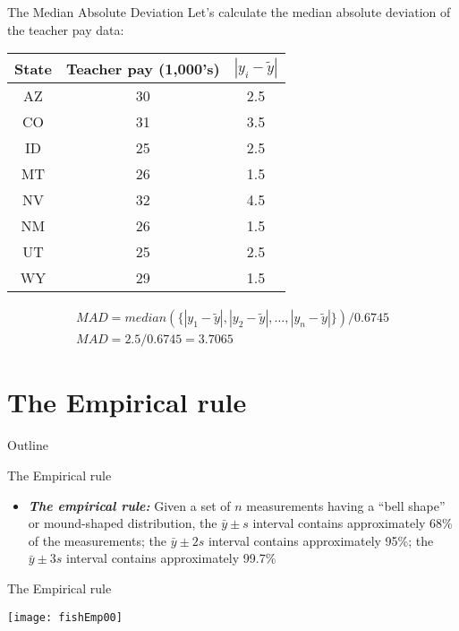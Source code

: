 \documentclass[xcolor=dvipsnames]{beamer}
\begin{document}
\begin{frame}{The Median Absolute Deviation}
	Let's calculate the median absolute deviation of the teacher pay data:
	\begin{center}
		\begin{tabular}{|c|c|c|}
			\hline 
			\textbf{State} & \textbf{Teacher pay (1,000's)} &  $|y_i-\tilde{y}|$ \\ 
			\hline \hline
			AZ & 30 & 2.5\\ \hline 
			CO &  31 & 3.5\\ \hline 
			ID & 25  & 2.5\\  \hline 
			MT &  26 & 1.5 \\ \hline 
			NV & 32 & 4.5\\ \hline 
			NM &  26 & 1.5\\ \hline 
			UT &  25 & 2.5\\ \hline 
			WY &  29 & 1.5\\ \hline 
		\end{tabular} 
	\end{center}
\begin{gather*}
	MAD = median(\{|y_1-\tilde{y}|,|y_2 - \tilde{y}|,\hdots,|y_n - \tilde{y}|\}) / 0.6745 \\
	MAD = 2.5 / 0.6745 = 3.7065
\end{gather*}
\end{frame}

\section{The Empirical rule}
\begin{frame}{Outline}
	\tableofcontents[currentsection,subsectionstyle=show/shaded/hide]
\end{frame}

\begin{frame}{The Empirical rule}
	\begin{itemize}
		\item \textbf{\emph{The empirical rule:}} Given a set of $n$ measurements having a ``bell shape'' or mound-shaped distribution, the $\bar{y} \pm s$ interval contains approximately 68\% of the measurements; the $\bar{y} \pm 2s$ interval contains approximately 95\%; the $\bar{y} \pm 3s$ interval contains approximately 99.7\%
	\end{itemize}
\end{frame}

\begin{frame}{The Empirical rule}
\begin{center}
	\texttt{[image: fishEmp00]}
\end{center}
\end{frame}
\end{document}
